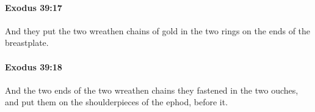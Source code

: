 		\paragraph{Exodus 39:17} %
			\label{EXODUS-39-17}

			And they put the two wreathen chains of gold in the two rings on the ends of the breastplate.


		\paragraph{Exodus 39:18} %
			\label{EXODUS-39-18}

			And the two ends of the two wreathen chains they fastened in the two ouches, and put them on the shoulderpieces of the ephod, before it.


